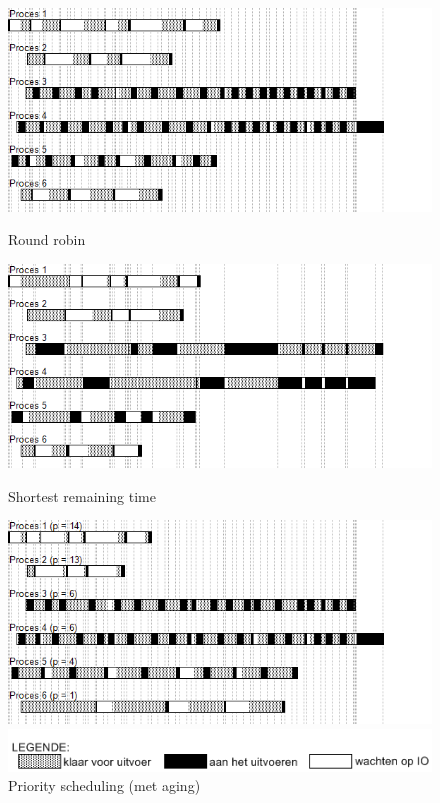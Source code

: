 \begin{figure}
\centering
  \includegraphics[width=\linewidth]{images/schedule_rr.png}
  \caption{Round robin}
  \label{fig:schedrr}
  \centering
  \includegraphics[width=\linewidth]{images/schedule_srt.png}
  \caption{Shortest remaining time}
  \label{fig:schedsrt}
  \centering
  \includegraphics[width=\linewidth]{images/schedule_ps_qua_age.png}
  \caption{Priority scheduling (met aging)}
  \label{fig:schedpspre}
  \includegraphics[width=0.8\linewidth]{images/legende.png}
\end{figure}



